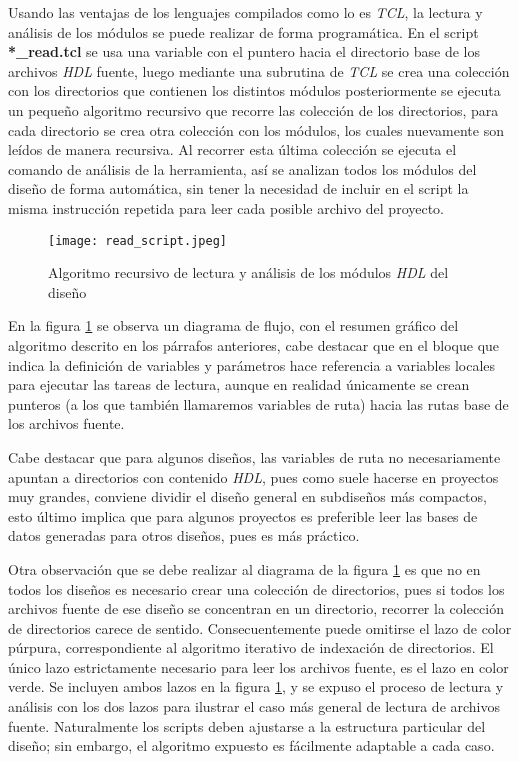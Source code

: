 Usando las ventajas de los lenguajes compilados como lo es \textit{TCL}, la lectura y análisis de los módulos se puede realizar de forma programática. En el script \textbf{*\_read.tcl} se usa una variable con el puntero hacia el directorio base de los archivos \textit{HDL} fuente, luego mediante una subrutina de \textit{TCL} se crea una colección con los directorios que contienen los distintos módulos posteriormente se ejecuta un pequeño algoritmo recursivo que recorre las colección de los directorios, para cada directorio se crea otra colección con los módulos, los cuales nuevamente son leídos de manera recursiva. Al recorrer esta última colección se ejecuta el comando de análisis de la herramienta, así se analizan todos los módulos del diseño de forma automática, sin tener la necesidad de incluir en el script la misma instrucción repetida para leer cada posible archivo del proyecto.

\begin{figure}[h]
\texttt{[image: read\_script.jpeg]}
\centering
\caption{Algoritmo recursivo de lectura y análisis de los módulos \textit{HDL} del diseño}
\label{s_read}
\end{figure}

En la figura \ref{s_read} se observa un diagrama de flujo, con el resumen gráfico del algoritmo descrito en los párrafos anteriores, cabe destacar que en el bloque que indica la definición de variables y parámetros hace referencia a variables locales para ejecutar las tareas de lectura, aunque en realidad únicamente se crean punteros (a los que también llamaremos variables de ruta) hacia las rutas base de los archivos fuente.

Cabe destacar que para algunos diseños, las variables de ruta no necesariamente apuntan a directorios con contenido \textit{HDL}, pues como suele hacerse en proyectos muy grandes, conviene dividir el diseño general en subdiseños más compactos, esto último implica que para algunos proyectos es preferible leer las bases de datos generadas para otros diseños, pues es más práctico.

Otra observación que se debe realizar al diagrama de la figura \ref{s_read} es que no en todos los diseños es necesario crear una colección de directorios, pues si todos los archivos fuente de ese diseño se concentran en un directorio, recorrer la colección de directorios carece de sentido. Consecuentemente puede omitirse el lazo de color púrpura, correspondiente al algoritmo iterativo de indexación de directorios. El único lazo estrictamente necesario para leer los archivos fuente, es el lazo en color verde. Se incluyen ambos lazos en la figura \ref{s_read}, y se expuso el proceso de lectura y análisis con los dos lazos para ilustrar el caso más general de lectura de archivos fuente. Naturalmente los scripts deben ajustarse a la estructura particular del diseño; sin embargo, el algoritmo expuesto es fácilmente adaptable a cada caso.

